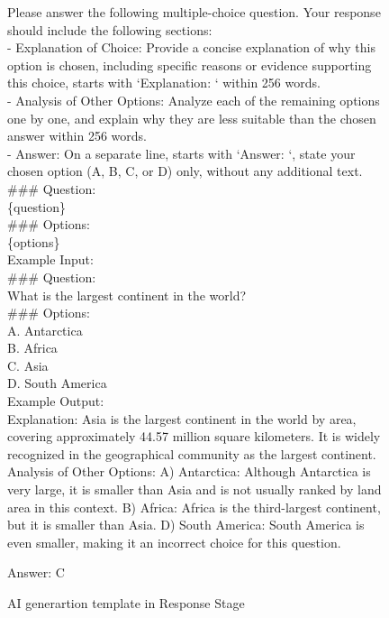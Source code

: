 \begin{figure*}[h]
\begin{tcolorbox}[colframe=cyan!40!black, title=\textbf{Prompt for Response Generation}]
Please answer the following multiple-choice question. Your response should include the following sections:\\

- Explanation of Choice: Provide a concise explanation of why this option is chosen, including specific reasons or evidence supporting this choice, starts with `Explanation: ` within 256 words.\\
- Analysis of Other Options: Analyze each of the remaining options one by one, and explain why they are less suitable than the chosen answer within 256 words.\\
- Answer: On a separate line, starts with `Answer: `, state your chosen option (A, B, C, or D) only, without any additional text.\\

  \#\#\# Question: \\
  \{question\}\\
  \#\#\# Options: \\
  \{options\}\\

  Example Input: \\
  
  \#\#\# Question: \\
  What is the largest continent in the world? \\
  \#\#\# Options:\\
  A. Antarctica \\
  B. Africa \\
  C. Asia \\
  D. South America\\

  Example Output: \\
  Explanation: Asia is the largest continent in the world by area, covering approximately 44.57 million square kilometers. It is widely recognized in the geographical community as the largest continent.
      Analysis of Other Options:
      A) Antarctica: Although Antarctica is very large, it is smaller than Asia and is not usually ranked by land area in this context.
      B) Africa: Africa is the third-largest continent, but it is smaller than Asia.
      D) South America: South America is even smaller, making it an incorrect choice for this question.

  Answer: C

\end{tcolorbox}
\caption{AI generartion template in Response Stage}
\label{prompt:resp}
\end{figure*}